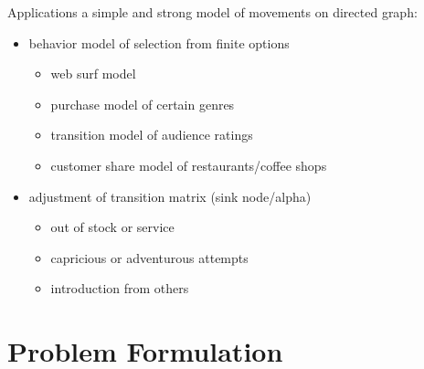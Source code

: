 \documentclass[fleqn,aspectratio=1610]{beamer}
\begin{document}
\begin{frame}[label={sec:orgc473165}]{Applications}
a simple and strong model of movements on directed graph:
\begin{itemize}
\item behavior model of selection from finite options
\begin{itemize}
\item web surf model
\item purchase model of certain genres
\item transition model of audience ratings
\item customer share model of restaurants/coffee shops
\end{itemize}
\item adjustment of transition matrix (sink node/alpha)
\begin{itemize}
\item out of stock or service
\item capricious or adventurous attempts
\item introduction from others
\end{itemize}
\end{itemize}
\end{frame}
\section{Problem Formulation}
\label{sec:orge18face}
\end{document}
